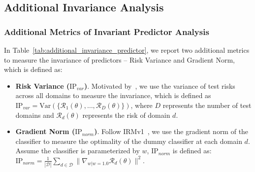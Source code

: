 \begin{table}[h]
\small
\caption{Results on datasets without spurious correlations. LISA performs similarly to ERM when there are no spurious correlations. However, Vanilla mixup outperforms LISA and ERM when there are no spurious correlations while underperforms LISA on datasets with spurious correlations. The results further strengthen our claim that the performance gains of LISA are not from simple data augmentation.}
\label{tab:app_no_spurious}

\begin{center}
\end{center}

\end{table}

\subsection{Additional Invariance Analysis}
\subsubsection{Additional Metrics of Invariant Predictor Analysis}
\label{sec:app_additional_predictor_invariance}
In Table~\ref{tab:additional_invariance_predictor}, we report two additional metrics to measure the invariance of predictors -- Risk Variance and Gradient Norm, which is defined as:
\begin{itemize}[leftmargin=*]
    \item \textbf{Risk Variance ($\mathrm{IP}_{var}$)}. Motivated by~\citet{krueger2021out}, we use the variance of test risks across all domains to measure the invariance, which is defined as $\mathrm{IP}_{var}=\mathrm{Var}(\{\mathcal{R}_1(\theta),\ldots, \mathcal{R}_D(\theta)\})$, where $D$ represents the number of test domains and $\mathcal{R}_d(\theta)$ represents the risk of domain $d$.
    \item \textbf{Gradient Norm ($\mathrm{IP}_{norm}$)}. Follow IRMv1~\cite{arjovsky2019invariant}, we use the gradient norm of the classifier to measure the optimality of the dummy classifier at each domain $d$. Assume the classifier is parameterized by $w$, $\mathrm{IP}_{norm}$ is defined as: $\mathrm{IP}_{norm}=\frac{1}{|\mathcal{D}|}\sum_{d\in \mathcal{D}}\| \nabla_{w|w=1.0} \mathcal{R}_d (\theta)\|^2$.
\end{itemize}



